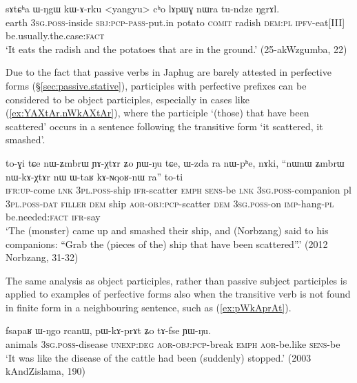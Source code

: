 \begin{exe}
\ex \label{ex:kArku.passive}
 \gll  sɤtɕʰa ɯ-ŋgɯ kɯ-ɤ-rku <yangyu> cʰo lɤpɯɣ nɯra tu-ndze ŋgrɤl. \\
 earth \textsc{3sg}.\textsc{poss}-inside \textsc{sbj}:\textsc{pcp}-\textsc{pass}-put.in potato \textsc{comit} radish \textsc{dem}:\textsc{pl} \textsc{ipfv}-eat[III] be.usually.the.case:\textsc{fact} \\
 \glt `It eats the radish and the potatoes that are in the ground.' (25-akWzgumba, 22)
\end{exe}

Due to the fact that passive verbs in Japhug are barely attested in perfective forms (§\ref{sec:passive.stative}), participles with perfective prefixes can be considered to be object participles, especially in cases like (\ref{ex:YAXtAr.nWkAXtAr}), where the participle   `(those) that have been scattered' occurs in a sentence following the transitive form  `it scattered, it smashed'.

\begin{exe}
\ex \label{ex:YAXtAr.nWkAXtAr}
 \gll    to-ɣi tɕe nɯ-ʑmbrɯ ɲɤ-χtɤr ʑo ɲɯ-ŋu tɕe, ɯ-zda ra nɯ-pʰe, nɤki,  ``nɯnɯ ʑmbrɯ nɯ-kɤ-χtɤr nɯ ɯ-taʁ kɤ-ɴqoʁ-nɯ ra'' to-ti\\
 \textsc{ifr}:\textsc{up}-come \textsc{lnk} \textsc{3pl}.\textsc{poss}-ship \textsc{ifr}-scatter \textsc{emph} \textsc{sens}-be \textsc{lnk} \textsc{3sg}.\textsc{poss}-companion pl \textsc{3pl}.\textsc{poss}-\textsc{dat} \textsc{filler} \textsc{dem} ship \textsc{aor}-\textsc{obj}:\textsc{pcp}-scatter \textsc{dem} \textsc{3sg}.\textsc{poss}-on \textsc{imp}-hang-\textsc{pl} be.needed:\textsc{fact} \textsc{ifr}-say\\
 \glt `The (monster) came up and smashed their ship, and (Norbzang) said to his companions: ``Grab the (pieces of the) ship that have been scattered''.' (2012 Norbzang, 31-32)
\end{exe}

The same analysis as object participles, rather than passive subject participles is applied to examples of perfective  forms also when the transitive verb is not found in finite form in a neighbouring sentence, such as (\ref{ex:pWkAprAt}).

\begin{exe}
\ex \label{ex:pWkAprAt}
 \gll fsapaʁ ɯ-ŋgo rcanɯ, pɯ-kɤ-prɤt ʑo tɤ-fse ɲɯ-ŋu. \\
 animals \textsc{3sg}.\textsc{poss}-disease \textsc{unexp}:\textsc{deg} \textsc{aor}-\textsc{obj}:\textsc{pcp}-break \textsc{emph} \textsc{aor}-be.like \textsc{sens}-be \\
 \glt  `It was like the disease of the cattle had been (suddenly) stopped.' (2003 kAndZislama, 190)
\end{exe}

